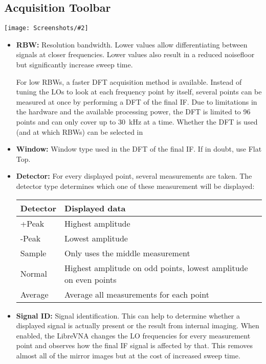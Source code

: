 \documentclass[a4paper,11pt]{article}
\newcommand{\vna}{LibreVNA}
\newcommand{\screenshot}[2]{\begin{center}
\texttt{[image: Screenshots/\#2]}
\end{center}}
\begin{document}
\subsection{Acquisition Toolbar}
\screenshot{0.7}{ToolbarSAAcquisition.png}
\begin{itemize}
\item \textbf{RBW:} Resolution bandwidth. Lower values allow differentiating between signals at closer frequencies. Lower values also result in a reduced noisefloor but significantly increase sweep time.

For low RBWs, a faster DFT acquisition method is available. Instead of tuning the LOs to look at each frequency point by itself, several points can be measured at once by performing a DFT of the final IF. Due to limitations in the hardware and the available processing power, the DFT is limited to 96 points and can only cover up to \SI{30}{\kilo\hertz} at a time. Whether the DFT is used (and at which RBWs) can be selected in 
\item \textbf{Window:} Window type used in the DFT of the final IF. If in doubt, use Flat Top.
\item \textbf{Detector:} For every displayed point, several measurements are taken. The detector type determines which one of these measurement will be displayed:
\begin{center}
\begin{threeparttable}
\begin{tabularx}{\textwidth}{L{2cm}|X}
    \toprule
    \textbf{Detector} & \textbf{Displayed data}\\
     \hline
      +Peak  	&    Highest amplitude\\ 
    \hline
      -Peak  	&    Lowest amplitude\\ 
    \hline
      Sample  	&    Only uses the middle measurement\\ 
    \hline
      Normal 	&    Highest amplitude on odd points, lowest amplitude on even points\\ 
    \hline
      Average  	&    Average all measurements for each point\\ 
      \bottomrule
\end{tabularx}
\end{threeparttable}
\end{center}
\item \textbf{Signal ID:} Signal identification. This can help to determine whether a displayed signal is actually present or the result from internal imaging. When enabled, the \vna{} changes the LO frequencies for every measurement point and observes how the final IF signal is affected by that. This removes almost all of the mirror images but at the cost of increased sweep time.


\end{itemize}
\end{document}
